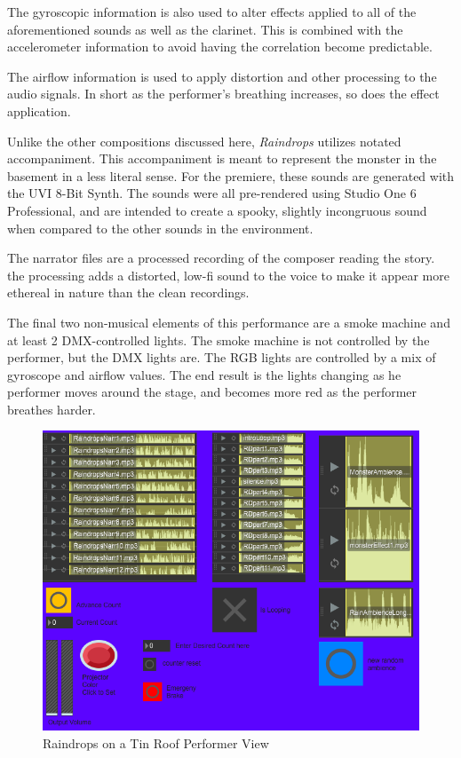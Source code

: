 The gyroscopic information is also used to alter effects applied to all of the aforementioned sounds as well as the clarinet. This is combined with the accelerometer information to avoid having the correlation become predictable.

The airflow information is used to apply distortion and other processing to the audio signals. In short as the performer's breathing increases, so does the effect application.

Unlike the other compositions discussed here, \textit{Raindrops} utilizes notated accompaniment. This accompaniment is meant to represent the monster in the basement in a less literal sense. For the premiere, these sounds are generated with the UVI 8-Bit Synth. The sounds were all pre-rendered using Studio One 6 Professional, and are intended to create a spooky, slightly incongruous sound when compared to the other sounds in the environment. 

The narrator files are a processed recording of the composer reading the story. the processing adds a distorted, low-fi sound to the voice to make it appear more ethereal in nature than the clean recordings. 

The final two non-musical elements of this performance are a smoke machine and at least 2 DMX-controlled lights. The smoke machine is not controlled by the performer, but the DMX lights are. The RGB lights are controlled by a mix of gyroscope and airflow values. The end result is the lights changing as he performer moves around the stage, and becomes more red as the performer breathes harder.

\begin{figure}
    \centering
    \includegraphics{diagrams/maxPatches/raindropspres.png}
    \caption{Raindrops on a Tin Roof Performer View}
    \label{fig:raindropsPres}
\end{figure}

